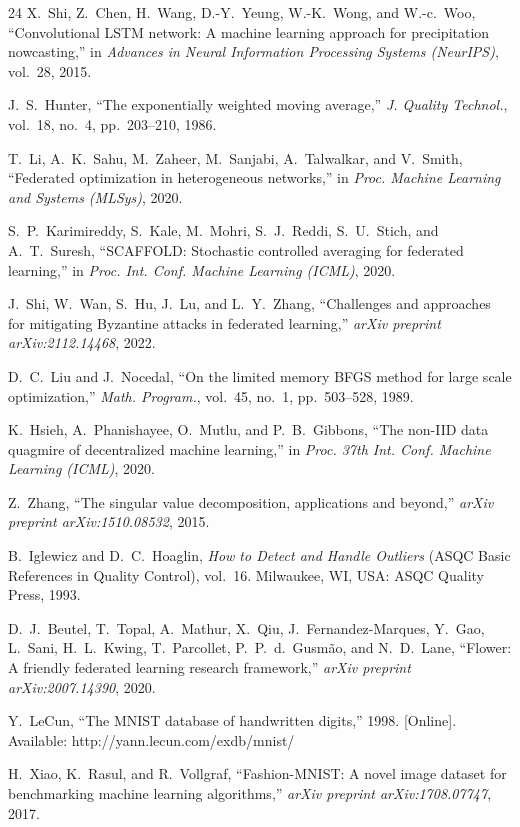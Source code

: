 \documentclass[journal]{IEEEtran}
\begin{document}
\begin{thebibliography}{24}
X.~Shi, Z.~Chen, H.~Wang, D.-Y.~Yeung, W.-K.~Wong, and W.-c.~Woo, ``Convolutional LSTM network: A machine learning approach for precipitation nowcasting,'' in \textit{Advances in Neural Information Processing Systems (NeurIPS)}, vol.~28, 2015.

J.~S.~Hunter, ``The exponentially weighted moving average,'' \textit{J. Quality Technol.}, vol.~18, no.~4, pp.~203--210, 1986.

T.~Li, A.~K.~Sahu, M.~Zaheer, M.~Sanjabi, A.~Talwalkar, and V.~Smith, ``Federated optimization in heterogeneous networks,'' in \textit{Proc. Machine Learning and Systems (MLSys)}, 2020.

S.~P.~Karimireddy, S.~Kale, M.~Mohri, S.~J.~Reddi, S.~U.~Stich, and A.~T.~Suresh, ``SCAFFOLD: Stochastic controlled averaging for federated learning,'' in \textit{Proc. Int. Conf. Machine Learning (ICML)}, 2020.

J.~Shi, W.~Wan, S.~Hu, J.~Lu, and L.~Y.~Zhang, ``Challenges and approaches for mitigating Byzantine attacks in federated learning,'' \textit{arXiv preprint arXiv:2112.14468}, 2022.

D.~C.~Liu and J.~Nocedal, ``On the limited memory BFGS method for large scale optimization,'' \textit{Math. Program.}, vol.~45, no.~1, pp.~503--528, 1989.

K.~Hsieh, A.~Phanishayee, O.~Mutlu, and P.~B.~Gibbons, ``The non-IID data quagmire of decentralized machine learning,'' in \textit{Proc. 37th Int. Conf. Machine Learning (ICML)}, 2020.

Z.~Zhang, ``The singular value decomposition, applications and beyond,'' \textit{arXiv preprint arXiv:1510.08532}, 2015.

B.~Iglewicz and D.~C.~Hoaglin, \textit{How to Detect and Handle Outliers} (ASQC Basic References in Quality Control), vol.~16.\hskip 1sp Milwaukee, WI, USA: ASQC Quality Press, 1993.

D.~J.~Beutel, T.~Topal, A.~Mathur, X.~Qiu, J.~Fernandez-Marques, Y.~Gao, L.~Sani, H.~L.~Kwing, T.~Parcollet, P.~P.~d.~Gusm\~{a}o, and N.~D.~Lane, ``Flower: A friendly federated learning research framework,'' \textit{arXiv preprint arXiv:2007.14390}, 2020.

Y.~LeCun, ``The MNIST database of handwritten digits,'' 1998. [Online]. Available: http://yann.lecun.com/exdb/mnist/

H.~Xiao, K.~Rasul, and R.~Vollgraf, ``Fashion-MNIST: A novel image dataset for benchmarking machine learning algorithms,'' \textit{arXiv preprint arXiv:1708.07747}, 2017.

\end{thebibliography}
\end{document}
